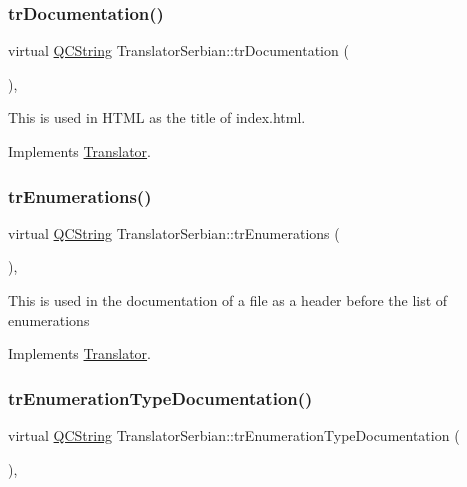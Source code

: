 \subsubsection{\texorpdfstring{trDocumentation()}{trDocumentation()}}
{\footnotesize\ttfamily virtual \mbox{\hyperlink{class_q_c_string}{Q\+C\+String}} Translator\+Serbian\+::tr\+Documentation (\begin{DoxyParamCaption}{ }\end{DoxyParamCaption})\hspace{0.3cm}{\ttfamily [inline]}, {\ttfamily [virtual]}}

This is used in H\+T\+ML as the title of index.\+html. 

Implements \mbox{\hyperlink{class_translator}{Translator}}.

\mbox{\label{class_translator_serbian_a1ea8330a78408817fe7deb5b8306b4c4}} 
\subsubsection{\texorpdfstring{trEnumerations()}{trEnumerations()}}
{\footnotesize\ttfamily virtual \mbox{\hyperlink{class_q_c_string}{Q\+C\+String}} Translator\+Serbian\+::tr\+Enumerations (\begin{DoxyParamCaption}{ }\end{DoxyParamCaption})\hspace{0.3cm}{\ttfamily [inline]}, {\ttfamily [virtual]}}

This is used in the documentation of a file as a header before the list of enumerations 

Implements \mbox{\hyperlink{class_translator}{Translator}}.

\mbox{\label{class_translator_serbian_ad717a37c47bbcad3fc268aefdd52c62e}} 
\subsubsection{\texorpdfstring{trEnumerationTypeDocumentation()}{trEnumerationTypeDocumentation()}}
{\footnotesize\ttfamily virtual \mbox{\hyperlink{class_q_c_string}{Q\+C\+String}} Translator\+Serbian\+::tr\+Enumeration\+Type\+Documentation (\begin{DoxyParamCaption}{ }\end{DoxyParamCaption})\hspace{0.3cm}{\ttfamily [inline]}, {\ttfamily [virtual]}}


